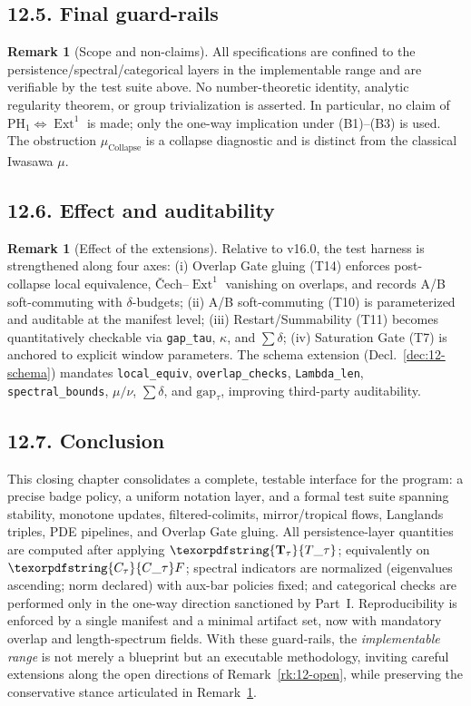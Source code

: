 \documentclass[11pt]{article}
\numberwithin{equation}{section}
\theoremstyle{plain}
\theoremstyle{definition}
\theoremstyle{remark}
\DeclareMathOperator{\Ext}{Ext}
\DeclareRobustCommand{\hyp}{\nobreakdash-}
\theoremstyle{plain}
\theoremstyle{definition}
\numberwithin{equation}{section}
\theoremstyle{definition}
\newtheorem{remark}[theorem]{Remark}
\DeclareRobustCommand{\Ttau}{\texorpdfstring{\ensuremath{\mathbf{T}_{\tau}}}{T\_\tau}}
\DeclareRobustCommand{\Ctau}{\texorpdfstring{\ensuremath{C_{\tau}}}{C\_\tau}}
\DeclareRobustCommand{\muc}{\mu_{\mathrm{Collapse}}}
\numberwithin{equation}{section}
\theoremstyle{plain}
\theoremstyle{definition}
\theoremstyle{remark}
\providecommand{\Cfun}[1]{\mathsf{C}_{#1}}
\providecommand{\Tfun}[1]{\mathbf{T}_{#1}}
\providecommand{\Ctau}{\Cfun{\tau}}
\providecommand{\Ttau}{\Tfun{\tau}}
\providecommand{\muc}{\mu_{\mathrm{Collapse}}}
\begin{document}
\subsection*{12.5. Final guard\hyp rails}
\begin{remark}[Scope and non\hyp claims]\label{rk:12-guards}
All specifications are confined to the persistence/spectral/categorical layers in the implementable range and are verifiable by the test suite above. No number\hyp theoretic identity, analytic regularity theorem, or group trivialization is asserted. In particular, no claim of \(\mathrm{PH}_1\Leftrightarrow \Ext^1\) is made; only the one\hyp way implication under (B1)–(B3) is used. The obstruction \(\muc\) is a collapse diagnostic and is distinct from the classical Iwasawa \(\mu\).
\end{remark}

\subsection*{12.6. Effect and auditability}
\begin{remark}[Effect of the extensions]
Relative to v16.0, the test harness is strengthened along four axes: (i) Overlap Gate gluing (T14) enforces post\hyp collapse local equivalence, Čech–\(\Ext^1\) vanishing on overlaps, and records A/B soft\hyp commuting with \(\delta\)\hyp budgets; (ii) A/B soft\hyp commuting (T10) is parameterized and auditable at the manifest level; (iii) Restart/Summability (T11) becomes quantitatively checkable via \texttt{gap\_tau}, \(\kappa\), and \(\sum\delta\); (iv) Saturation Gate (T7) is anchored to explicit window parameters. The schema extension (Decl.~\ref{dec:12-schema}) mandates \texttt{local\_equiv}, \texttt{overlap\_checks}, \texttt{Lambda\_len}, \texttt{spectral\_bounds}, \(\mu/\nu\), \(\sum\delta\), and \(\mathrm{gap}_{\tau}\), improving third\hyp party auditability.
\end{remark}

\subsection*{12.7. Conclusion}
This closing chapter consolidates a complete, testable interface for the program: a precise badge policy, a uniform notation layer, and a formal test suite spanning stability, monotone updates, filtered\hyp colimits, mirror/tropical flows, Langlands triples, PDE pipelines, and Overlap Gate gluing. All persistence\hyp layer quantities are computed after applying \(\Ttau\); equivalently on \(\Ctau F\); spectral indicators are normalized (eigenvalues ascending; norm declared) with aux\hyp bar policies fixed; and categorical checks are performed only in the one\hyp way direction sanctioned by Part~I. Reproducibility is enforced by a single manifest and a minimal artifact set, now with mandatory overlap and length\hyp spectrum fields. With these guard\hyp rails, the \emph{implementable range} is not merely a blueprint but an executable methodology, inviting careful extensions along the open directions of Remark~\ref{rk:12-open}, while preserving the conservative stance articulated in Remark~\ref{rk:12-guards}.
\end{document}
